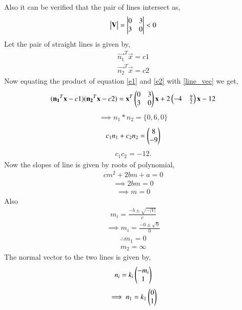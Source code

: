 \documentclass[journal,12pt,twocolumn]{IEEEtran}
\begin{document}
Also it can be verified that the pair of lines intersect as,
\begin{align}
\begin{vmatrix}\mathbf{V}\end{vmatrix} = \begin{vmatrix}0&3\\3&0\end{vmatrix} <0 
\end{align} 
Let the pair of straight lines is given by,
\begin{align}
\vec{n_1}^T\vec{x} = c1
\label{e1}
\end{align}
\begin{align}
\vec{n_2}^T\vec{x} = c2
\label{e2}
\end{align}
Now equating the product of equation \eqref{e1} and \eqref{e2} with \eqref{line_vec} we get,
\begin{align}
(\mathbf{n_1}^T\mathbf{x} - c1)(\mathbf{n_2}^T\mathbf{x} - c2) = \mathbf{x}^T\begin{pmatrix}0&3\\3&0\end{pmatrix}\mathbf{x} + 2\begin{pmatrix}-4& \frac{9}{2}\end{pmatrix}\mathbf{x} - 12 
\end{align}
\begin{align}
\implies n_1 * n_2 = \{0,6,0\}
\label{verify}
\end{align}
\begin{align}
c_1n_1+c_2n_2 = \begin{pmatrix}8\\-9\end{pmatrix}
\label{sub1}
\end{align}
\begin{align}
c_1c_2 = -12.
\end{align}
Now the slopes of line is given by roots of polynomial,
\begin{align}
cm^2 + 2bm + a = 0
\end{align} 
\begin{align}
\implies 2bm = 0
\end{align}
\begin{align}
\implies m = 0
\end{align}
Also
\begin{align}
m_i = \frac{-b\pm\sqrt{-|V|}}{c} 
\end{align}
\begin{align}
\implies m_i = \frac{-0\pm\sqrt{9}}{0} 
\end{align}
\begin{align}
\therefore m_1 = 0
\end{align}
\begin{align}
 m_2 = \infty
\end{align}
The normal vector to the two lines is given by,
\begin{align}
n_i = k_i\begin{pmatrix}-m_i\\1\end{pmatrix}
\end{align}
\begin{align}
\implies n_1 = k_1\begin{pmatrix}0\\1\end{pmatrix}
\end{align}\\
\end{document}
